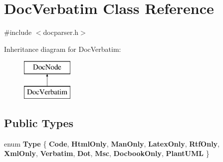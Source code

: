 \hypertarget{class_doc_verbatim}{}\section{Doc\+Verbatim Class Reference}
\label{class_doc_verbatim}


{\ttfamily \#include $<$docparser.\+h$>$}

Inheritance diagram for Doc\+Verbatim\+:\begin{figure}[H]
\begin{center}
\leavevmode
\includegraphics[height=2.000000cm]{class_doc_verbatim}
\end{center}
\end{figure}
\subsection*{Public Types}
\begin{DoxyCompactItemize}
\item 
\mbox{\label{class_doc_verbatim_ad8c770dcf2e62369b95f4e34fb11fa36}} 
enum {\bfseries Type} \{ \newline
{\bfseries Code}, 
{\bfseries Html\+Only}, 
{\bfseries Man\+Only}, 
{\bfseries Latex\+Only}, 
\newline
{\bfseries Rtf\+Only}, 
{\bfseries Xml\+Only}, 
{\bfseries Verbatim}, 
{\bfseries Dot}, 
\newline
{\bfseries Msc}, 
{\bfseries Docbook\+Only}, 
{\bfseries Plant\+U\+ML}
 \}
\end{DoxyCompactItemize}

